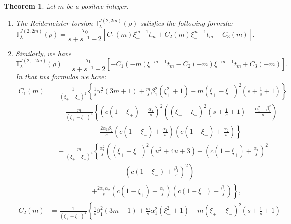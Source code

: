 \documentclass[a4paper]{amsart}
\theoremstyle{plain}
\newtheorem{theorem}{Theorem}
\theoremstyle{definition}
\theoremstyle{remark}
\begin{document}
\begin{theorem}\label{theorem_J(2,2m)}
Let $m$ be a positive integer.
\begin{enumerate}
  \item  The Reidemeister torsion ${\mathbb T}^{J(2, 2m)}_{\lambda}(\rho)$ satisfies the following formula:
\begin{equation}\label{m_pos}
{\mathbb T}^{J(2, 2m)}_{\lambda}(\rho)
=
\frac{\tau_0}{s+s^{-1} - 2} 
\left[
    C_1(m) \xi_{+}^{m-1} t_m + C_2(m) \xi_{-}^{m-1} t_m + C_3(m)
\right].
\end{equation}
\item  Similarly, we have
\begin{equation}\label{m_neg}
{\mathbb T}^{J(2, -2m)}_{\lambda}(\rho)
=
\frac{\tau_0}{s+s^{-1} - 2} 
\left[
    -C_1(-m) \xi_{+}^{-m-1} t_m - C_2(-m) \xi_{-}^{-m-1} t_m + C_3(-m)
\right].
\end{equation}
In that two formulas we have:
\begin{align*}%
C_1(m)
&= 
\frac{1}{(\xi_{+} - \xi_{-})^2} 
\left\{
\frac{1}{s} \alpha_1^2 (3m+1) + \frac{m}{s}\beta_1^2 (\xi_{+}^2+1) - m(\xi_{+}-\xi_{-})^2(s+\frac{1}{s}+1) 
\right\}\\
& \quad 
    -\frac{m}{(\xi_{+}-\xi_{-})^4}
    \left\{
    \left( c(1-\xi_{+}) + \frac{\alpha_1}{s}\right)^2  
    \left( (\xi_{+}-\xi_{-})^2(s+\frac{1}{s}+1) - \frac{\alpha_1^2+\beta_1^2}{s}\right)
    \right.\\
& \left. \qquad \qquad \qquad
     +\frac{2\alpha_1\beta_2}{s}\left(c(1-\xi_{+})+\frac{\alpha_1}{s}\right)\left(c(1-\xi_{+})+\frac{\alpha_2}{s}\right) \right\} \\
& \quad
    -\frac{m}{(\xi_{+}-\xi_{-})^4}
    \left\{
       \frac{\alpha_1^2}{s}
        \left( 
        (\xi_{+} - \xi_{-})^2(u^2+4u+3) - \left( c(1-\xi_{+}) + \frac{\alpha_1}{s}\right)^2 
        \right.
    \right.\\
&        \qquad \qquad \qquad \qquad \qquad
    \left.
        \left.
        -\left(c(1-\xi_{-}) + \frac{\beta_1}{s}\right)^2
        \right)
        \right. \\
& \qquad \qquad \qquad \left. 
        + \frac{2\alpha_1\alpha_2}{s}
        \left(
        c(1-\xi_{+}) +\frac{\alpha_1}{s}
        \right)
        \left(
        c(1-\xi_{-}) +\frac{\beta_2}{s}
        \right) 
        \right\},
\end{align*}
\begin{align*}%
C_2(m)
&=
\frac{1}{(\xi_{+} -\xi_{-})^2}
\left\{
\frac{1}{s} \beta_1^2 (3m+1) + \frac{m}{s}\alpha_1^2 (\xi_{-}^2+1) - m(\xi_{+}-\xi_{-})^2(s+\frac{1}{s}+1) 

\end{align*}
\end{enumerate}
\end{theorem}
\end{document}
